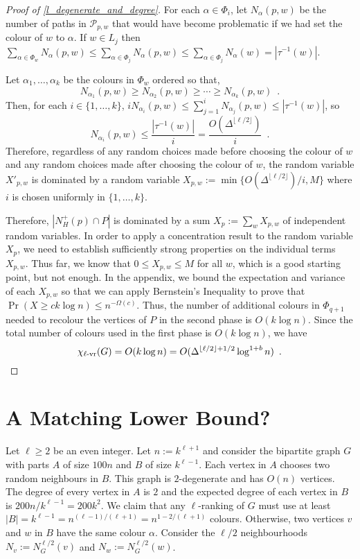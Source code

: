\documentclass{patmorin}
\newcommand{\rn}[1]{\chi_{\operatorname{#1-vr}}}
\newcommand{\lrn}{\rn{\ell}}
\begin{document}
\begin{proof}[Proof of \cref{l_degenerate_and_degree}]
  For each $\alpha\in\Phi_i$, let $N_\alpha(p,w)$ be the number of paths in $\mathcal{P}_{p,w}$ that would have become problematic if we had set the colour of $w$ to $\alpha$. If $w\in L_j$ then $\sum_{\alpha\in\Phi_w} N_\alpha(p,w) \le \sum_{\alpha\in\Phi_j} N_\alpha(p,w) \le \sum_{\alpha\in\Phi_j} N_\alpha(w) = |\tau^{-1}(w)|$.

  Let $\alpha_1,\ldots,\alpha_k$ be the colours in $\Phi_w$ ordered so that,
  \[
    N_{\alpha_1}(p,w) \ge N_{\alpha_2}(p,w) \ge\cdots\ge N_{\alpha_k}(p,w) \enspace .
  \]
  Then, for each $i\in\{1,\ldots,k\}$, $iN_{\alpha_i}(p,w)\le\sum_{j=1}^i N_{\alpha_j}(p,w) \le |\tau^{-1}(w)|$, so
  \[
    N_{\alpha_i}(p,w)\le \frac{|\tau^{-1}(w)|}{i}=\frac{O(\Delta^{\lfloor\ell/2\rfloor})}{i} \enspace .
  \]
  Therefore, regardless of any random choices made before choosing the colour of $w$ and any random choices made after choosing the colour of $w$, the random variable $X'_{p,w}$ is dominated by a random variable $X_{p,w}:=\min\{O(\Delta^{\lfloor\ell/2\rfloor})/i,M\}$ where $i$ is chosen uniformly in $\{1,\ldots,k\}$.

  Therefore, $|N_H^+(p)\cap P|$ is dominated by a sum $X_p:=\sum_{w} X_{p,w}$ of independent random variables.  In order to apply a concentration result to the random variable $X_p$, we need to  establish sufficiently strong properties on the individual terms $X_{p,w}$.  Thus far, we know that $0\le X_{p,w}\le M$ for all $w$, which is a good starting point, but not enough.  In the appendix, we bound the expectation and variance of each $X_{p,w}$ so that we can apply Bernstein's Inequality to prove that $\Pr(X\ge ck\log n)\le n^{-\Omega(c)}$.  Thus, the number of additional colours in $\Phi_{q+1}$ needed to recolour the vertices of $P$ in the second phase is $O(k\log n)$.  Since the total number of colours used in the first phase is $O(k\log n)$, we have
  \[
    \lrn(G) = O(k \log n) = O(\Delta^{\lfloor\ell/2\rfloor+1/2}\log^{1+b} n) \enspace . \qedhere
  \]
\end{proof}
%



\section{A Matching Lower Bound?}

Let $\ell\ge 2$ be an even integer.  Let $n:=k^{\ell+1}$ and consider the bipartite graph $G$ with parts $A$ of size $100n$ and $B$ of size $k^{\ell-1}$.  Each vertex in $A$ chooses two random neighbours in $B$.  This graph is $2$-degenerate and has $O(n)$ vertices.  The degree of every vertex in $A$ is $2$ and the expected degree of each vertex in $B$ is $200n/k^{\ell-1}=200k^{2}$.  We claim that any $\ell$-ranking of $G$ must use at least $|B|=k^{\ell-1}=n^{(\ell-1)/(\ell+1)}=n^{1-2/(\ell+1)}$ colours.  Otherwise, two vertices $v$ and $w$ in $B$ have the same colour $\alpha$.  Consider the $\ell/2$ neighbourhoods $N_v:=N^{\ell/2}_G(v)$ and $N_w:=N^{\ell/2}_G(w)$.
\end{document}
